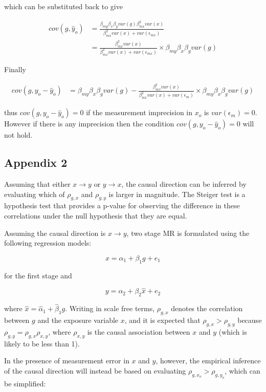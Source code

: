 \documentclass[]{article}
\begin{document}
which can be substituted back to give

\[
\begin{aligned}
cov(g, \hat{y}_o) & = \frac{\beta_{my} \beta_x \beta_g var(g) \beta_{mx}^2 var(x)} {\beta_{mx}^2 var(x) + var(\epsilon_{mx})} \\
                  & = \frac{\beta_{mx}^2 var(x)} {\beta_{mx}^2 var(x) + var(\epsilon_{mx})} \times \beta_{my} \beta_x \beta_g var(g)
\end{aligned}
\]

Finally

\[
\begin{aligned}
cov(g, y_o - \hat{y}_o) & = \beta_{my} \beta_x \beta_g var(g) - \frac{\beta_{mx}^2 var(x)} {\beta_{mx}^2 var(x) + var(\epsilon_m)} \times \beta_{my} \beta_x \beta_g var(g)
\end{aligned}
\]

thus \(cov(g, y_o - \hat{y}_o) = 0\) if the measurement imprecision in
\(x_o\) is \(var(\epsilon_m) = 0\). However if there is any imprecision
then the condition \(cov(g, y_o - \hat{y}_o) = 0\) will not hold.

\subsection{Appendix 2}\label{appendix-2}

Assuming that either \(x \rightarrow y\) or \(y \rightarrow x\), the
causal direction can be inferred by evaluating which of \(\rho_{g, x}\)
and \(\rho_{g, y}\) is larger in magnitude. The Steiger test is a
hypothesis test that provides a p-value for observing the difference in
these correlations under the null hypothesis that they are equal.

Assuming the causal direction is \(x \to y\), two stage MR is formulated
using the following regression models:

\[
x = \alpha_1 + \beta_1 g + e_1
\]

for the first stage and

\[
y = \alpha_2 + \beta_2 \hat{x} + e_2
\]

where \(\hat{x} = \hat{\alpha}_1 + \hat{\beta}_1 g\). Writing in scale
free terms, \(\rho_{g, x}\) denotes the correlation between \(g\) and
the exposure variable \(x\), and it is expected that
\(\rho_{g, x} > \rho_{g, y}\) because
\(\rho_{g, y} = \rho_{g, x}\rho_{x, y}\), where \(\rho_{x, y}\) is the
causal association between \(x\) and \(y\) (which is likely to be less
than 1).

In the presence of measurement error in \(x\) and \(y\), however, the
empirical inference of the causal direction will instead be based on
evaluating \(\rho_{g, x_o} > \rho_{g, y_o}\), which can be simplified:
\end{document}
